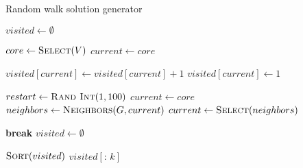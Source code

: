 \begin{algorithm}[t]
  \caption{Random walk solution generator}\label{alg:RANDOM-WALK-SMART-INIT}
  \begin{algorithmic}[1]
    \State $visited \leftarrow \emptyset$

    \State $core \leftarrow \Call{Select}{V}$
    \State $current \leftarrow core$

    \State $visited\left[current\right] \leftarrow visited\left[current\right] + 1$
    \Else
    \State $visited\left[current\right] \leftarrow 1$
    \EndIf

    \State $restart \leftarrow \Call{Rand Int}{1, 100}$
    \State $current \leftarrow core$
    \Else
    \State $neighbors \leftarrow \Call{Neighbors}{G, current}$
    \State $current \leftarrow \Call{Select}{neighbors}$
    \EndIf
    \EndFor

    \State \textbf{break}
    \Else
    \State $visited \leftarrow \emptyset$
    \EndIf
    \EndWhile

    \State $\Call{Sort}{visited}$
    \State \Return $visited\left[ {:}\,k \right]$
    \EndFunction
  \end{algorithmic}
\end{algorithm}

